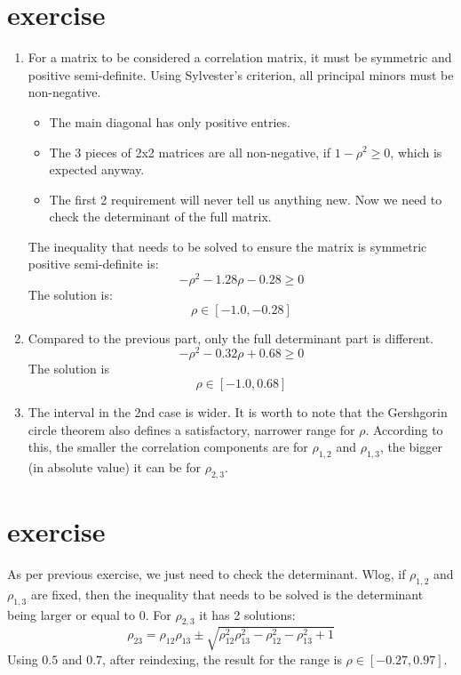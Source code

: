 \documentclass{article}
\begin{document}
\section{exercise}
\begin{enumerate}
    \item
          For a matrix to be considered a correlation matrix,
          it must be symmetric and positive semi-definite.
          Using Sylvester's criterion, all principal minors must be non-negative.
          \begin{itemize}
              \item The main diagonal has only positive entries.
              \item The 3 pieces of 2x2 matrices are all non-negative,
                    if $1-\rho^2\ge0$, which is expected anyway.
              \item The first 2 requirement will never tell us anything new.
                    Now we need to check the determinant of the full matrix.
          \end{itemize}

          The inequality that needs to be solved to ensure the matrix is symmetric positive semi-definite is:
          \[
              -\rho^2 - 1.28\rho - 0.28 \geq 0
          \]
          The solution is:
          \[
              \rho \in [-1.0, -0.28]
          \]
    \item Compared to the previous part, only the full determinant part is different.
          \[
              -\rho^2 - 0.32\rho + 0.68 \geq 0
          \]
          The solution is
          \[
              \rho \in [-1.0, 0.68]
          \]
    \item The interval in the 2nd case is wider. It is worth to note that the Gershgorin circle theorem
          also defines a satisfactory, narrower range for $\rho$.
          According to this,
          the smaller the correlation components are for $\rho_{1,2}$ and $\rho_{1,3}$,
          the bigger (in absolute value) it can be for $\rho_{2,3}$.
\end{enumerate}

\section{exercise}
As per previous exercise, we just need to check the determinant.
Wlog, if $\rho_{1,2}$ and $\rho_{1,3}$ are fixed,
then the inequality that needs to be solved is the determinant being larger or equal to 0.
For $\rho_{2,3}$ it has 2 solutions:
\[
    \rho_{23} = \rho_{12} \rho_{13} \pm \sqrt{\rho_{12}^2 \rho_{13}^2 - \rho_{12}^2 - \rho_{13}^2 + 1}
\]
Using $0.5$ and $0.7$,
after reindexing,
the result for the range is $\rho \in [-0.27, 0.97]$.
\end{document}
